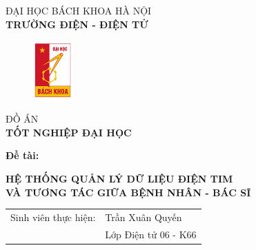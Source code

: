 
\begin{titlepage}
     \begin{center}
     \vspace{-12pt} ĐẠI HỌC BÁCH KHOA HÀ NỘI \\ %
     \textbf{\fontsize{16pt}{0pt}\selectfont TRƯỜNG ĐIỆN - ĐIỆN TỬ}
     \begin{figure}[H] %
         \vspace{0.5cm} %
         \centering
         \includegraphics[width=1.53cm,height=2.26cm]{Images/logohust.png}
     \end{figure}
     \vspace{1.5cm}
     \fontsize{24pt}{0pt}\selectfont ĐỒ ÁN \\ %
     \vspace{12pt}
     \textbf{\fontsize{32pt}{0pt}\selectfont TỐT NGHIỆP ĐẠI HỌC} %
     \vspace{1.5cm}
     \end{center}
     \hspace{8pt}\textbf{\fontsize{14pt}{0pt}\selectfont Đề tài:}
     \begin{center}
   
          \textbf{\fontsize{18pt}{0pt}\selectfont HỆ THỐNG QUẢN LÝ DỮ LIỆU ĐIỆN TIM}\\
           \textbf{\fontsize{18pt}{0pt}\selectfont VÀ TƯƠNG TÁC GIỮA BỆNH NHÂN - BÁC SĨ}
     
     \vspace{1.5cm}
     
     \begin{table}[H]%
          \centering
          \begin{tabular}{l l}
               \fontsize{14pt}{0pt}\selectfont Sinh viên thực hiện:      & \fontsize{14pt}{0pt}\selectfont Trần Xuân Quyến\\
                 &\fontsize{14pt}{0pt}\selectfont Lớp Điện tử 06 - K66  \vspace{6pt} \\
                 

\end{tabular}
\end{table}
\end{center}
\end{titlepage}
